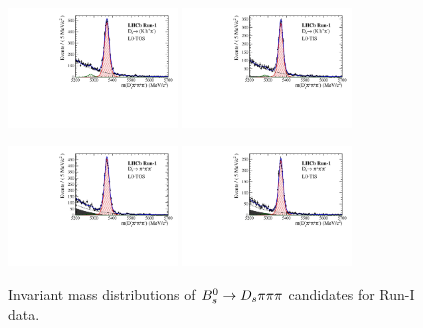 \begin{figure}[h]
\includegraphics[height=!,width=0.4\textwidth]{figs/MassFit/norm_Run1_KKpi_NR_t0.pdf}
\includegraphics[height=!,width=0.4\textwidth]{figs/MassFit/norm_Run1_KKpi_NR_t1.pdf}

\includegraphics[height=!,width=0.4\textwidth]{figs/MassFit/norm_Run1_pipipi_t0.pdf}
\includegraphics[height=!,width=0.4\textwidth]{figs/MassFit/norm_Run1_pipipi_t1.pdf}
\caption{Invariant mass distributions of ${{B}^0_{s}}\rightarrow{\ensuremath{{D}_{s}}}{\ensuremath{\pi}}{\ensuremath{\pi}}{\ensuremath{\pi}}$ candidates for Run-I data.}
\label{fig:massfits_norm_Run1}
\end{figure}

\clearpage

